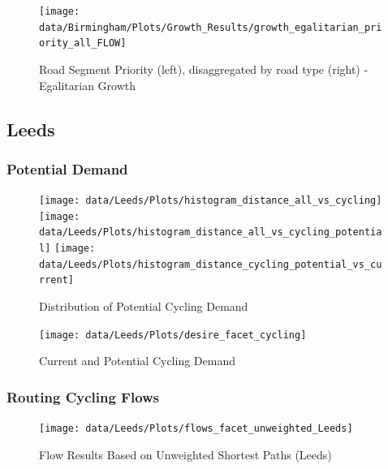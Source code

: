 \documentclass[
]{article}
\begin{document}
\begin{figure}

{\centering \texttt{[image: data/Birmingham/Plots/Growth\_Results/growth\_egalitarian\_priority\_all\_FLOW]} 

}

\caption{Road Segment Priority (left), disaggregated by road type (right) - Egalitarian Growth}\label{fig:growth3MapandBarBirmingham}
\end{figure}

\clearpage

\hypertarget{leeds}{%
\subsection{Leeds}\label{leeds}}

\subsubsection{Potential Demand}

\begin{figure}
\texttt{[image: data/Leeds/Plots/histogram\_distance\_all\_vs\_cycling]} \texttt{[image: data/Leeds/Plots/histogram\_distance\_all\_vs\_cycling\_potential]} \texttt{[image: data/Leeds/Plots/histogram\_distance\_cycling\_potential\_vs\_current]} \caption{Distribution of Potential Cycling Demand}\label{fig:potdemhistogramsLeeds}
\end{figure}

\begin{figure}[H]

{\centering \texttt{[image: data/Leeds/Plots/desire\_facet\_cycling]} 

}

\caption{Current and Potential Cycling Demand}\label{fig:desirefacetcyclingLeeds}
\end{figure}

\clearpage

\subsubsection{Routing Cycling Flows}

\begin{figure}

{\centering \texttt{[image: data/Leeds/Plots/flows\_facet\_unweighted\_Leeds]} 

}

\caption{Flow Results Based on Unweighted Shortest Paths (Leeds)}\label{fig:flowsfacetunweightedLeeds}
\end{figure}
\end{document}
